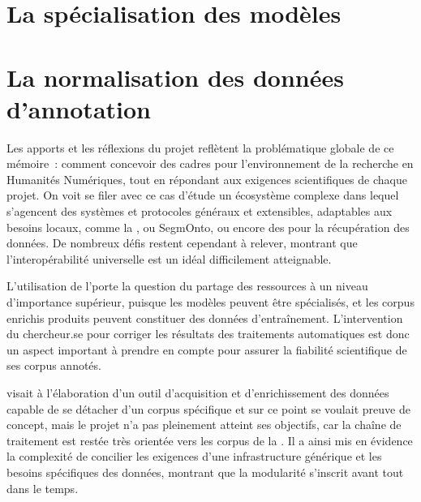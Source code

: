                  \hypertarget{specialisation-modeles}{%
                \section{La spécialisation des modèles}\label{specialisation-modeles}}
                
                    
                \hypertarget{normalisation-donnees}{\section{%
                La normalisation des données d'annotation}\label{normalisation-donnees}}
                    
                    

              


\vspace{2cm}


Les apports et les réflexions du projet \gaga reflètent la problématique globale de ce
mémoire~: comment concevoir des cadres pour l'environnement de la
recherche en Humanités Numériques, tout en répondant aux exigences
scientifiques de chaque projet. On voit se filer avec ce cas d'étude un écosystème complexe dans lequel s'agencent des systèmes et protocoles généraux et extensibles, adaptables aux besoins locaux, comme la \tei, ou SegmOnto, ou encore des \api pour la récupération des données. De nombreux défis restent cependant à relever, montrant que l'interopérabilité universelle est un idéal difficilement atteignable.

L'utilisation de l'\ia porte la question du partage des ressources à un niveau d'importance supérieur, puisque les modèles peuvent être spécialisés, et les corpus enrichis produits peuvent constituer des données d'entraînement. L'intervention du chercheur.se pour corriger les résultats des traitements automatiques est donc un aspect important à prendre en compte pour assurer la fiabilité scientifique de ses corpus annotés. 

\gaga visait à l'élaboration d'un
outil d'acquisition et d'enrichissement des données capable de se
détacher d'un corpus spécifique et sur ce point se voulait preuve de concept, mais le projet
n'a pas pleinement atteint ses objectifs, car la chaîne de traitement est restée très orientée vers les corpus de la \bnf. Il a ainsi mis en
évidence la complexité de concilier les exigences d'une infrastructure
générique et les besoins spécifiques des données, montrant que la modularité s'inscrit avant tout dans le temps. 

